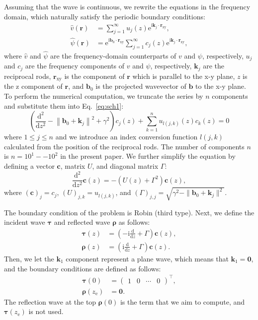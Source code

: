\documentclass[preprint, 5p, times, sort&compress]{elsarticle}
\def\vecr{\bm{r}}
\def\veck{\bm{k}}
\def\vecb{\bm{b}}
\def\vecc{\bm{c}}
\def\vtau{\bm{\tau}}
\def\vrho{\bm{\rho}}
\def\zbot{z_\text{e}}
\def\dd{\mathrm{d}}
\def\imag{\mathrm{i}}
\def\ee{\mathrm{e}}
\def\vzero{\bm{0}}
\begin{document}
        Assuming that the wave is continuous, we rewrite the equations in the frequency domain,
        which naturally satisfy the periodic boundary conditions:
        \begin{align}
                \hat{v}(\vecr) &= \sum_{j=1}^\infty u_j(z)\ee^{\imag\veck_j\cdot \vecr_{\mathrm{xy}}}, \\
                \hat{\psi}(\vecr) &= \ee^{\imag\vecb_0\cdot \vecr_{\mathrm{xy}}}\sum_{j=1}^\infty c_j(z)\ee^{\imag\veck_j\cdot \vecr_{\mathrm{xy}}},
        \end{align}
        where $\hat{v}$ and $\hat{\psi}$ are the frequency-domain counterparts of $v$ and $\psi$, respectively,
        $u_j$ and $c_j$ are the frequency components of $v$ and $\psi$, respectively,
        $\veck_j$ are the reciprocal rods,
        $\vecr_{\mathrm{xy}}$ is the component of $\vecr$ which is parallel to the x-y plane,
        $z$ is the z component of $\vecr$, and $\vecb_0$ is the projected wavevector of $\vecb$ to the x-y plane.
        To perform the numerical computation, we truncate the series by $n$ components and substitute them into Eq.~\eqref{eq:sch1}: 
        \begin{equation}
                \left(\frac{\dd^2}{\dd z^2}-\left\|\vecb_0+\veck_j\right\|^2+\gamma^2\right)c_j(z) + \sum_{k=1}^n u_{l(j,k)}(z)c_k(z) = 0 \label{eq:sch2}
        \end{equation}
        where $1\le j \le n$ and we introduce an index conversion function $l(j, k)$ calculated from the position of the reciprocal rods.
        The number of components $n$ is $n=10^1 -- 10^2$ in the present paper. 
        We further simplify the equation by defining a vector $\vecc$, matrix $U$, and diagonal matrix $\Gamma$:
        \begin{equation}
                \frac{\dd^2}{\dd z^2}\vecc(z) = -(U(z) + \Gamma^2)\vecc(z), \label{eq:sch3}
        \end{equation}
        where $(\vecc)_j=c_j$, $(U)_{j,k}=u_{l(j,k)}$, and $(\Gamma)_{j,j}=\sqrt{\gamma^2-\|\vecb_0+\veck_j\|^2}$.

        The boundary condition of the problem is Robin (third type).
        Next, we define the incident wave $\vtau$ and reflected wave $\vrho$ as follows:
        \begin{align}
                \vtau(z) &= \left(-\mathrm{i}\frac{\dd}{\dd z}+\Gamma\right)\vecc(z), \label{eq:vtau} \\
                \vrho(z) &= \left(\mathrm{i}\frac{\dd}{\dd z}+\Gamma\right)\vecc(z). \label{eq:vrho}
        \end{align}
        Then, we let the $\veck_1$ component represent a plane wave, which means that $\veck_1=\vzero$, and
        the boundary conditions are defined as follows:
        \begin{align}
                \vtau(0) &= \begin{pmatrix}1&0&\cdots&0\end{pmatrix}^\top, \label{eq:bd0}\\
                \vrho(\zbot) &= \mathbf{0}. \label{eq:bd1}
        \end{align}
        The reflection wave at the top $\vrho(0)$ is the term that we aim to compute, and $\vtau(\zbot)$ is not used.
\end{document}
